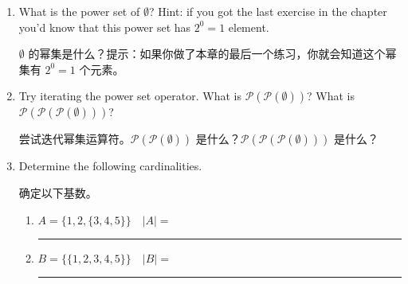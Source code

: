 \begin{enumerate}
  \item What is the power set of $\emptyset$?  Hint: if you got the last exercise
  in the chapter you'd know that this power set has $2^0 = 1$ element.
  
  $\emptyset$ 的幂集是什么？提示：如果你做了本章的最后一个练习，你就会知道这个幂集有 $2^0 = 1$ 个元素。
  
  \wbvfill
  
  \item Try iterating the power set operator.  What is ${\mathcal P}({\mathcal P}(\emptyset))$?
  What is ${\mathcal P}({\mathcal P}({\mathcal P}(\emptyset)))$?
  
  尝试迭代幂集运算符。${\mathcal P}({\mathcal P}(\emptyset))$ 是什么？${\mathcal P}({\mathcal P}({\mathcal P}(\emptyset)))$ 是什么？
  
  
  \wbvfill
  
  \workbookpagebreak
  
  \item Determine the following cardinalities.
  
  确定以下基数。
  \begin{enumerate}
      \item $A = \{ 1, 2, \{3, 4, 5\}\} \quad |A| = $\rule{36pt}{1pt}
      \item $B = \{ \{1, 2, 3, 4, 5\} \} \quad |B| = $\rule{36pt}{1pt}  
    \end{enumerate}
  
  
  \wbvfill
  

\end{enumerate}
